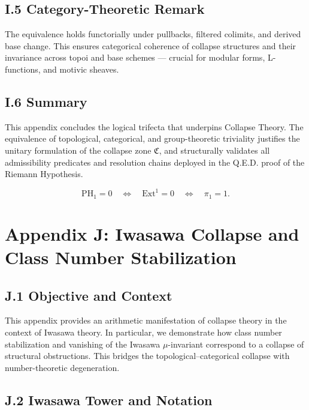 \documentclass[11pt]{article}
\begin{document}
\subsection*{I.5 Category-Theoretic Remark}

The equivalence holds functorially under pullbacks, filtered colimits, and derived base change. This ensures categorical coherence of collapse structures and their invariance across topoi and base schemes — crucial for modular forms, L-functions, and motivic sheaves.

\subsection*{I.6 Summary}

This appendix concludes the logical trifecta that underpins Collapse Theory. The equivalence of topological, categorical, and group-theoretic triviality justifies the unitary formulation of the collapse zone \( \mathfrak{C} \), and structurally validates all admissibility predicates and resolution chains deployed in the Q.E.D. proof of the Riemann Hypothesis.

\[
\mathrm{PH}_1 = 0 \quad \iff \quad \mathrm{Ext}^1 = 0 \quad \iff \quad \pi_1 = 1.
\]



\appendix
\section*{Appendix J: Iwasawa Collapse and Class Number Stabilization}

\subsection*{J.1 Objective and Context}

This appendix provides an arithmetic manifestation of collapse theory in the context of Iwasawa theory. In particular, we demonstrate how class number stabilization and vanishing of the Iwasawa $\mu$-invariant correspond to a collapse of structural obstructions. This bridges the topological–categorical collapse with number-theoretic degeneration.

\subsection*{J.2 Iwasawa Tower and Notation}
\end{document}

